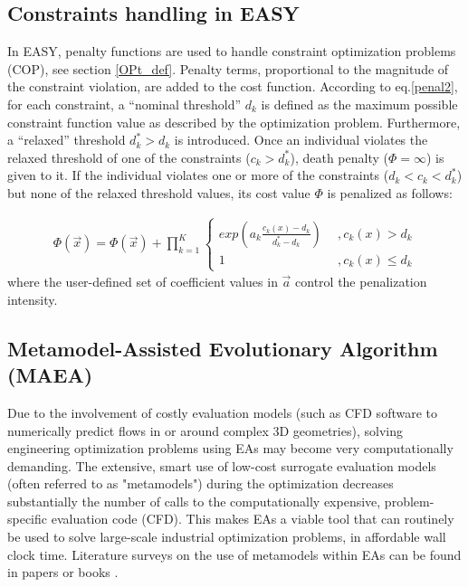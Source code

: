 \subsection{Constraints handling in EASY}
\label{COP}
In EASY, penalty functions are used to handle constraint optimization problems (COP), see section \ref{OPt_def}. Penalty terms, proportional to the magnitude of the constraint violation, are added to the cost function. According to eq.\ref{penal2}, for each constraint, a ``nominal threshold'' $d_k$ is defined as the maximum possible constraint function value as described by the optimization problem. Furthermore, a ``relaxed'' threshold $d_k^* > d_k$ is introduced. Once an individual violates the relaxed threshold of one of the constraints ($c_k>d_k^*$), death penalty ($\Phi = \infty$) is given to it. If the individual violates one or more of the constraints ($d_k<c_k<d_k^*$) but none of the relaxed threshold values, its cost value $\Phi$ is penalized as follows:

\begin{eqnarray}
	\Phi(\vec{x})=\Phi(\vec{x})+ \prod _{k=1}^K{\left\{ 				\begin{array}{ll}
    exp(a_k\frac{c_k(x)-d_k}{d_k^* -d_k}) & ~~,c_k(x)>d_k\\
    1 & ~~,c_k(x)\leq d_k\end{array} \right. }
    \label{penal2}
\end{eqnarray}  
where the user-defined set of coefficient values in $\vec{a}$ control the penalization intensity.

 

\subsection{Metamodel-Assisted Evolutionary Algorithm (MAEA)}
\label{MAEApar}
Due to the involvement of costly evaluation models (such as CFD software to numerically predict flows in or around complex 3D geometries), solving engineering optimization problems using EAs may become very computationally demanding. The extensive, smart use of low-cost surrogate evaluation models (often referred to as "metamodels") during the optimization decreases substantially the number of calls to the computationally expensive, problem-specific evaluation code (CFD). This makes EAs a viable tool that can routinely be used to solve large-scale industrial optimization problems, in affordable wall clock time. Literature surveys on the use of metamodels within EAs can be found in papers \cite{LTT_2_020,Jin2002,LTT_2_027,EBNK} or books \cite{KEANEbook}.



